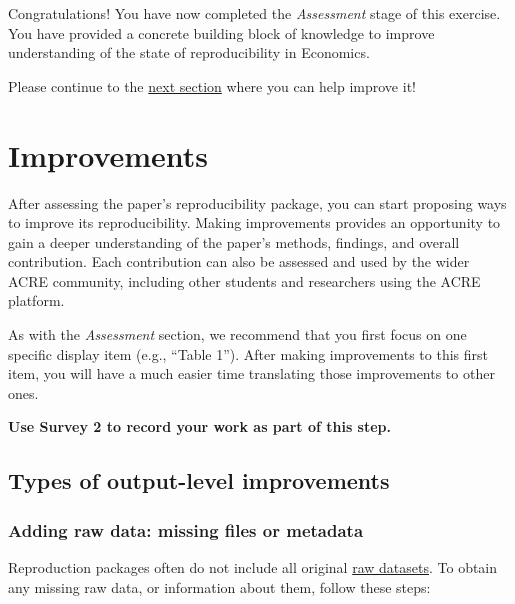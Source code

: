 \documentclass[]{book}
\begin{document}
Congratulations! You have now completed the \emph{Assessment} stage of this exercise. You have provided a concrete building block of knowledge to improve understanding of the state of reproducibility in Economics.

Please continue to the \protect\hyperlink{improvements}{next section} where you can help improve it!

\hypertarget{improvements}{%
\chapter{Improvements}\label{improvements}}

After assessing the paper's reproducibility package, you can start proposing ways to improve its reproducibility. Making improvements provides an opportunity to gain a deeper understanding of the paper's methods, findings, and overall contribution. Each contribution can also be assessed and used by the wider ACRE community, including other students and researchers using the ACRE platform.

As with the \emph{Assessment} section, we recommend that you first focus on one specific display item (e.g., ``Table 1''). After making improvements to this first item, you will have a much easier time translating those improvements to other ones.

\textbf{Use Survey 2 to record your work as part of this step.}

\hypertarget{di-imp}{%
\section{Types of output-level improvements}\label{di-imp}}

\hypertarget{rd}{%
\subsection{Adding raw data: missing files or metadata}\label{rd}}

Reproduction packages often do not include all original \protect\hyperlink{describe-inputs}{raw datasets}. To obtain any missing raw data, or information about them, follow these steps:
\end{document}
